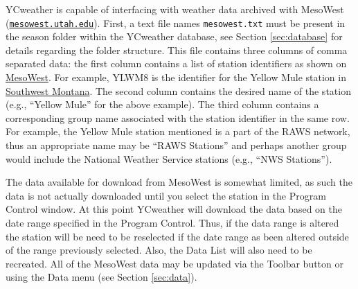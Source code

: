 \label{sec:mesowest}
YCweather is capable of interfacing with weather data archived with MesoWest (\href{http://mesowest.utah.edu/index.html}{\nolinkurl{mesowest.utah.edu}}).  First, a text file names \texttt{mesowest.txt} must be present in the season folder within the YCweather database, see Section \ref{sec:database} for details regarding the folder structure.  This file contains three columns of comma separated data: the first column contains a list of station identifiers as shown on \href{http://mesowest.utah.edu/index.html}{MesoWest}.  For example, YLWM8 is the identifier for the Yellow Mule station in \href{http://mesowest.utah.edu/cgi-bin/droman/mesomap.cgi?state=MT&rawsflag=3}{Southwest Montana}.  The second column contains the desired name of the station (e.g., ``Yellow Mule'' for the above example). The third column contains a corresponding group name associated with the station identifier in the same row.  For example, the Yellow Mule station mentioned is a part of the RAWS network, thus an appropriate name may be ``RAWS Stations'' and perhaps another group would include the National Weather Service stations (e.g., ``NWS Stations'').

The data available for download from MesoWest is somewhat limited, as such the data is not actually downloaded until you select the station in the Program Control window. At this point YCweather will download the data based on the date range specified in the Program Control. Thus, if the data range is altered the station will be need to be reselected if the date range as been altered outside of the range previously selected. Also, the Data List will also need to be recreated. All of the MesoWest data may be updated via the Toolbar button or using the Data menu (see Section \ref{sec:data}).

